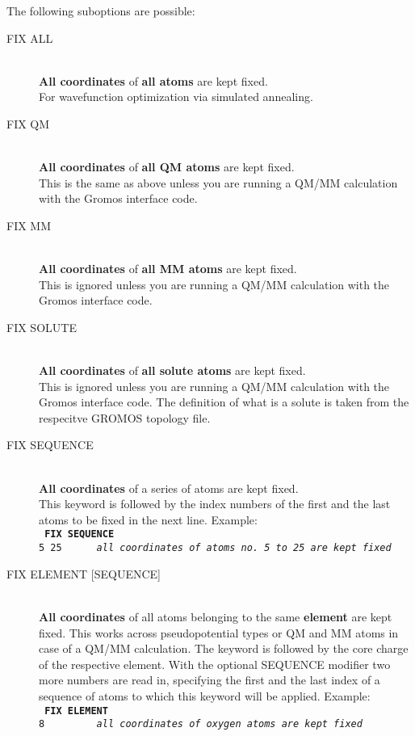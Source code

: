 \documentclass[twoside,10pt,titlepage,a4paper]{article}
\begin{document}
    The following suboptions are possible:

     \begin{description}
        \item[FIX ALL]\hfill \\
          {\bf All coordinates} of {\bf all atoms} are kept fixed.\\
           For wavefunction optimization via simulated annealing.

        \item[FIX QM]\hfill \\
          {\bf All coordinates} of {\bf all QM atoms} are kept fixed.\\
          This is the same as above unless you are running a QM/MM
          calculation with the Gromos interface code.

        \item[FIX MM]\hfill \\
          {\bf All coordinates} of {\bf all MM atoms} are kept fixed.\\
           This is ignored unless you are running a QM/MM
           calculation with the Gromos interface code.

        \item[FIX SOLUTE]\hfill \\
          {\bf All coordinates} of {\bf all solute atoms} are kept fixed.\\
           This is ignored unless you are running a QM/MM
           calculation with the Gromos interface code.
           The definition of what is a solute is taken from the
           respecitve GROMOS topology file.

        \item[FIX SEQUENCE]\hfill \\
          {\bf All coordinates} of a series of atoms are kept fixed.\\
          This keyword is followed by the index numbers of the first and
          the last atoms to be fixed in the next line.
          Example: \\
          {\tt
            {\bf FIX SEQUENCE}\\
            5~25~~~~~~{\small \sl all coordinates of atoms no. 5 to 25 are kept fixed}
            }

        \item[FIX ELEMENT {[SEQUENCE]}] \hfill \\
          \textbf{All coordinates} of all atoms belonging to the same
          \textbf{element} are kept fixed. This works across
          pseudopotential types or QM and MM atoms in case of a QM/MM
          calculation. The keyword is followed by the core charge of
          the respective element. With the optional SEQUENCE modifier
          two more numbers are read in, specifying the first and the
          last index of a sequence of atoms to which this keyword will
          be applied.
          Example: \\
          {\tt
            {\bf FIX ELEMENT}\\
            8~~~~~~~~~{\small \sl all coordinates of oxygen atoms are kept fixed}
            }



\end{description}
\end{document}

